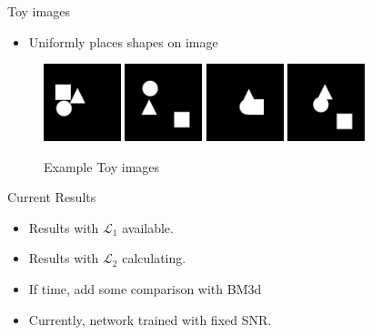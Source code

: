 \documentclass[aspectratio=169]{beamer}
\begin{document}
\begin{frame}{Toy images}
    \begin{itemize}
        \item Uniformly places shapes on image
    \end{itemize}

    \begin{figure}
        \includegraphics[width=0.2\textwidth]{toyimage_01}
        \includegraphics[width=0.2\textwidth]{toyimage_02}
        \includegraphics[width=0.2\textwidth]{toyimage_03}
        \includegraphics[width=0.2\textwidth]{toyimage_04}
        \caption{Example Toy images}
    \end{figure}
    
\end{frame}

\begin{frame}{Current Results}
    \begin{itemize}
        \item Results with $\mathcal{L}_1$ available.
        \item Results with $\mathcal{L}_2$ calculating.
        \item If time, add some comparison with BM3d
        \item Currently, network trained with fixed SNR.
    \end{itemize}
\end{frame}
\end{document}

